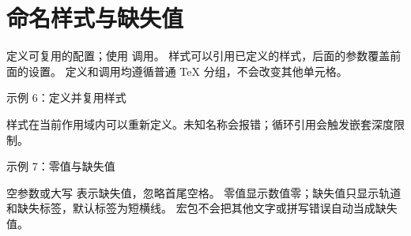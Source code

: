 \section{命名样式与缺失值}
 定义可复用的配置；使用  调用。
样式可以引用已定义的样式，后面的参数覆盖前面的设置。
定义和调用均遵循普通 TeX 分组，不会改变其他单元格。

\begin{example}{示例 6：定义并复用样式}

\end{example}

样式在当前作用域内可以重新定义。未知名称会报错；循环引用会触发嵌套深度限制。

\begin{example}{示例 7：零值与缺失值}


\gradbar[missing text={N/A}]{}
\end{example}

空参数或大写  表示缺失值，忽略首尾空格。
零值显示数值零；缺失值只显示轨道和缺失标签，默认标签为短横线。
宏包不会把其他文字或拼写错误自动当成缺失值。

